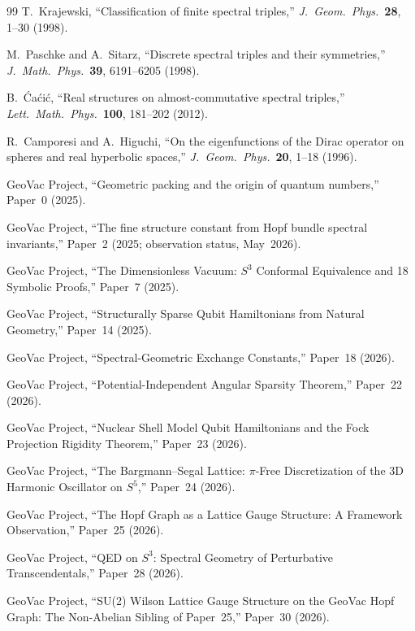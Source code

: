 \documentclass[11pt]{article}
\begin{document}
\begin{thebibliography}{99}
T.~Krajewski,
``Classification of finite spectral triples,''
\textit{J.~Geom.~Phys.}\ \textbf{28}, 1--30 (1998).

M.~Paschke and A.~Sitarz,
``Discrete spectral triples and their symmetries,''
\textit{J.~Math.~Phys.}\ \textbf{39}, 6191--6205 (1998).

B.~\'Ca\'ci\'c,
``Real structures on almost-commutative spectral triples,''
\textit{Lett.~Math.~Phys.}\ \textbf{100}, 181--202 (2012).

R.~Camporesi and A.~Higuchi,
``On the eigenfunctions of the Dirac operator on spheres and real
hyperbolic spaces,''
\textit{J.~Geom.~Phys.}\ \textbf{20}, 1--18 (1996).

GeoVac Project, ``Geometric packing and the origin of quantum
numbers,'' Paper~0 (2025).

GeoVac Project, ``The fine structure constant from Hopf bundle
spectral invariants,'' Paper~2 (2025; observation status, May~2026).

GeoVac Project, ``The Dimensionless Vacuum: $S^3$ Conformal
Equivalence and 18 Symbolic Proofs,'' Paper~7 (2025).

GeoVac Project, ``Structurally Sparse Qubit Hamiltonians from Natural
Geometry,'' Paper~14 (2025).

GeoVac Project, ``Spectral-Geometric Exchange Constants,'' Paper~18
(2026).

GeoVac Project, ``Potential-Independent Angular Sparsity Theorem,''
Paper~22 (2026).

GeoVac Project, ``Nuclear Shell Model Qubit Hamiltonians and the
Fock Projection Rigidity Theorem,'' Paper~23 (2026).

GeoVac Project, ``The Bargmann--Segal Lattice: $\pi$-Free
Discretization of the 3D Harmonic Oscillator on $S^5$,'' Paper~24
(2026).

GeoVac Project, ``The Hopf Graph as a Lattice Gauge Structure: A
Framework Observation,'' Paper~25 (2026).

GeoVac Project, ``QED on $S^3$: Spectral Geometry of Perturbative
Transcendentals,'' Paper~28 (2026).

GeoVac Project, ``SU(2) Wilson Lattice Gauge Structure on the GeoVac
Hopf Graph: The Non-Abelian Sibling of Paper~25,'' Paper~30 (2026).


\end{thebibliography}
\end{document}
